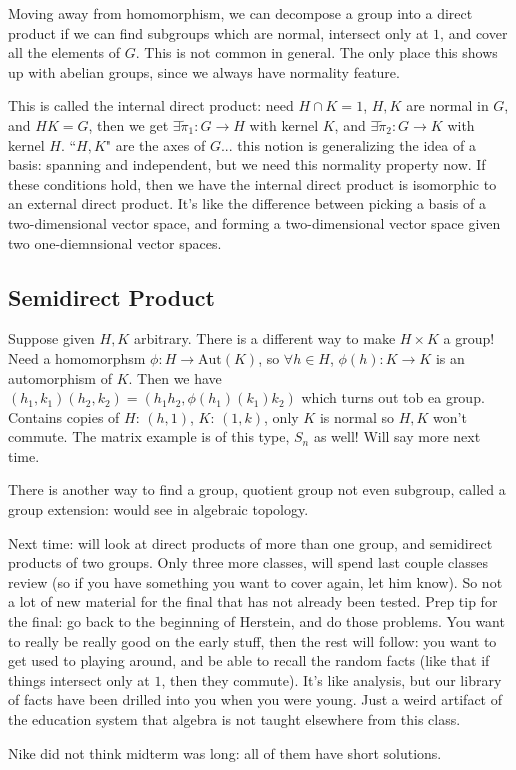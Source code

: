 \documentclass{article}
\theoremstyle{plain}
\theoremstyle{remark}
\begin{document}
Moving away from homomorphism, we can decompose a group into a direct product
if we can find subgroups which are normal, intersect only at $1$,
and cover all the elements of $G$.
This is not common in general.
The only place this shows up with abelian groups,
since we always have normality feature.

This is called the internal direct product:
need $H \cap K = 1$, $H,K$ are normal in $G$, and $HK = G$,
then we get $\exists \tilde{\pi}_1 \colon G \to H$ with kernel $K$,
and $\exists \tilde{\pi}_2 \colon G \to K$ with kernel $H$.
``$H,K$" are the axes of $G$...
this notion is generalizing the idea of a basis: spanning and independent,
but we need this normality property now.
If these conditions hold, then we have the internal direct product
is isomorphic to an external direct product.
It's like the difference between picking a basis of a two-dimensional vector space,
and forming a two-dimensional vector space given two one-diemnsional vector spaces.

\subsection{Semidirect Product}
Suppose given $H,K$ arbitrary.
There is a different way to make $H \times K$ a group!
Need a homomorphsm $\phi \colon H \to \mathrm{Aut}(K)$,
so $\forall h \in H$, $\phi(h)\colon K \to K$ is an automorphism of $K$.
Then we have $(h_1,k_1)(h_2,k_2) = (h_1h_2, \phi(h_1)(k_1)k_2)$
which turns out tob ea group.
Contains copies of $H$: $(h,1)$, $K$: $(1,k)$,
only $K$ is normal so $H,K$ won't commute.
The matrix example is of this type, $S_n$ as well!
Will say more next time.

There is another way to find a group, quotient group not even subgroup,
called a group extension: would see in algebraic topology.

Next time: will look at direct products of more than one group,
and semidirect products of two groups.
Only three more classes, will spend last couple classes review
(so if you have something you want to cover again, let him know).
So not a lot of new material for the final that has not already been tested.
Prep tip for the final: go back to the beginning of Herstein,
and do those problems.
You want to really be really good on the early stuff,
then the rest will follow:
you want to get used to playing around, and be able to recall the random facts
(like that if things intersect only at $1$, then they commute).
It's like analysis, but our library of facts have been drilled into you when you were young.
Just a weird artifact of the education system that algebra is not taught elsewhere from this class.

Nike did not think midterm was long: all of them have short solutions.
\end{document}
